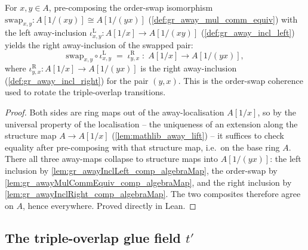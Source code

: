 \begin{lemma}

  \label{lem:gr_awayMulCommEquiv_comp_awayInclLeft}
  For \(x, y \in A\), pre-composing the order-swap isomorphism
  \(\mathrm{swap}_{x,y} : A[1/(xy)] \cong A[1/(yx)]\)
  (\cref{def:gr_away_mul_comm_equiv}) with the left away-inclusion
  \(\iota^{\mathrm{L}}_{x,y} : A[1/x] \to A[1/(xy)]\)
  (\cref{def:gr_away_incl_left}) yields the right away-inclusion of the swapped
  pair:
  \[
    \mathrm{swap}_{x,y} \circ \iota^{\mathrm{L}}_{x,y}
      \;=\; \iota^{\mathrm{R}}_{y,x}
      \;:\; A[1/x] \longrightarrow A[1/(yx)] ,
  \]
  where \(\iota^{\mathrm{R}}_{y,x} : A[1/x] \to A[1/(yx)]\) is the right
  away-inclusion (\cref{def:gr_away_incl_right}) for the pair \((y, x)\). This is
  the order-swap coherence used to rotate the triple-overlap transitions.
\end{lemma}
\begin{proof}
  \leanok
  Both sides are ring maps out of the away-localisation \(A[1/x]\), so by the
  universal property of the localisation -- the uniqueness of an extension along
  the structure map \(A \to A[1/x]\) (\cref{lem:mathlib_away_lift}) -- it suffices
  to check equality after pre-composing with that structure map, i.e.\ on the base
  ring \(A\). There all three away-maps collapse to structure maps into
  \(A[1/(yx)]\): the left inclusion by
  \cref{lem:gr_awayInclLeft_comp_algebraMap}, the order-swap by
  \cref{lem:gr_awayMulCommEquiv_comp_algebraMap}, and the right inclusion by
  \cref{lem:gr_awayInclRight_comp_algebraMap}. The two composites therefore agree
  on \(A\), hence everywhere. Proved directly in Lean.
\end{proof}

\subsection*{The triple-overlap glue field \(t'\)}

